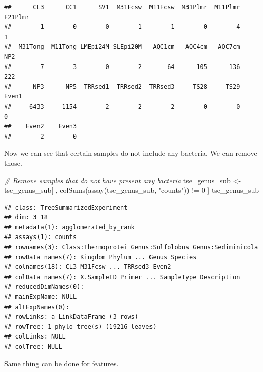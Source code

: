 \documentclass[
]{book}
\newenvironment{Shaded}{\begin{snugshade}}{\end{snugshade}}
\newcommand{\CommentTok}[1]{\textcolor[rgb]{0.56,0.35,0.01}{\textit{#1}}}
\newcommand{\DecValTok}[1]{\textcolor[rgb]{0.00,0.00,0.81}{#1}}
\newcommand{\FunctionTok}[1]{\textcolor[rgb]{0.00,0.00,0.00}{#1}}
\newcommand{\NormalTok}[1]{#1}
\newcommand{\OtherTok}[1]{\textcolor[rgb]{0.56,0.35,0.01}{#1}}
\newcommand{\SpecialCharTok}[1]{\textcolor[rgb]{0.00,0.00,0.00}{#1}}
\newcommand{\StringTok}[1]{\textcolor[rgb]{0.31,0.60,0.02}{#1}}
\begin{document}
\begin{verbatim}
##      CL3      CC1      SV1  M31Fcsw  M11Fcsw  M31Plmr  M11Plmr  F21Plmr 
##        1        0        0        1        1        0        4        1 
##  M31Tong  M11Tong LMEpi24M SLEpi20M   AQC1cm   AQC4cm   AQC7cm      NP2 
##        7        3        0        2       64      105      136      222 
##      NP3      NP5  TRRsed1  TRRsed2  TRRsed3     TS28     TS29    Even1 
##     6433     1154        2        2        2        0        0        0 
##    Even2    Even3 
##        2        0
\end{verbatim}

Now we can see that certain samples do not include any bacteria. We can remove those.

\begin{Shaded}
\begin{Highlighting}[]
\CommentTok{\# Remove samples that do not have present any bacteria}
\NormalTok{tse\_genus\_sub }\OtherTok{\textless{}{-}}\NormalTok{ tse\_genus\_sub[ , }\FunctionTok{colSums}\NormalTok{(}\FunctionTok{assay}\NormalTok{(tse\_genus\_sub, }\StringTok{"counts"}\NormalTok{)) }\SpecialCharTok{!=} \DecValTok{0}\NormalTok{ ]}
\NormalTok{tse\_genus\_sub}
\end{Highlighting}
\end{Shaded}

\begin{verbatim}
## class: TreeSummarizedExperiment 
## dim: 3 18 
## metadata(1): agglomerated_by_rank
## assays(1): counts
## rownames(3): Class:Thermoprotei Genus:Sulfolobus Genus:Sediminicola
## rowData names(7): Kingdom Phylum ... Genus Species
## colnames(18): CL3 M31Fcsw ... TRRsed3 Even2
## colData names(7): X.SampleID Primer ... SampleType Description
## reducedDimNames(0):
## mainExpName: NULL
## altExpNames(0):
## rowLinks: a LinkDataFrame (3 rows)
## rowTree: 1 phylo tree(s) (19216 leaves)
## colLinks: NULL
## colTree: NULL
\end{verbatim}

Same thing can be done for features.

\begin{Shaded}
\end{Shaded}
\end{document}
